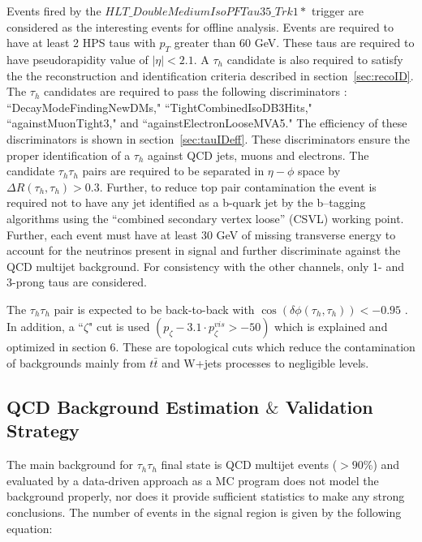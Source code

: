 Events fired by the $HLT\_DoubleMediumIsoPFTau35\_Trk1*$ trigger are considered as the interesting events for offline analysis. Events are required to have at 
least 2 HPS taus with $p_{T}$ greater than 60 GeV. These taus are required to have pseudorapidity value of $|\eta| < 2.1$. A $\tau_{h}$ candidate is also 
required to satisfy the the reconstruction and identification criteria described in section~\ref{sec:recoID}. The $\tau_{h}$ candidates are required to pass the 
following discriminators : ``DecayModeFindingNewDMs," ``TightCombinedIsoDB3Hits," ``againstMuonTight3,"  and ``againstElectronLooseMVA5."  The efficiency of 
these discriminators is shown in section~\ref{sec:tauIDeff}. These discriminators ensure the proper identification of a $\tau_{h}$ against QCD jets, muons and electrons. The candidate $\tau_{h}\tau_{h}$ pairs are required to be separated in $\eta-\phi$ space by $\Delta R(\tau_{h},\tau_{h}) > 0.3 $. Further, to reduce top pair contamination the event is required not to have any jet identified as a b-quark jet by the b–tagging algorithms using the “combined secondary vertex loose” (CSVL) working point. Further, each event must have at least 30 GeV of missing transverse energy to account for the neutrinos present in signal and further discriminate against the QCD multijet background. For consistency with the other channels, only 1- and 3-prong taus are considered. 

The $\tau_{h}\tau_{h}$ pair is expected to be back-to-back with $\cos(\delta\phi(\tau_{h},\tau_{h})) < -0.95$ . In addition, a ``$\zeta$" cut is used 
$(p_{\zeta}- 3.1\cdot p_{\zeta}^{vis} > -50)$ which is explained and optimized in section 6. These are topological cuts which reduce the contamination of backgrounds mainly from  $t\bar{t}$ and W+jets processes to negligible levels.  



\subsection{QCD Background Estimation $\&$ Validation Strategy}

The main background for $\tau_{h}\tau_{h}$ final state is QCD multijet events ($>90\%$) and evaluated by a data-driven approach as a MC program does not model the background properly, nor does it provide sufficient statistics to make any strong conclusions.
The number of events in the signal region is given by the following equation: 

